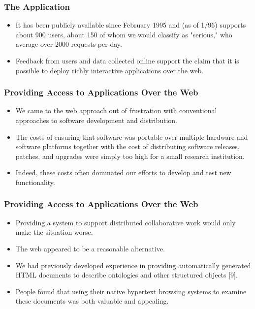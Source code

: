 \documentclass{beamer}
\begin{document}
\begin{frame}
\frametitle{The Application}

\begin{itemize}
\item It has been publicly available since February 1995 and (as of 1/96) supports about 900 users, about 150 of whom we would classify as "serious," who average over 2000 requests per day.
\item Feedback from users and data collected online support the claim that it is possible to deploy richly interactive applications over the web.
\end{itemize}

\end{frame}

\begin{frame}
\frametitle{Providing Access to Applications Over the Web}

\begin{itemize}
\item We came to the web approach out of frustration with conventional approaches to software development and distribution.
\item The costs of ensuring that software was portable over multiple hardware and software platforms together with the cost of distributing software releases, patches, and upgrades were simply too high for a small research institution.
\item Indeed, these costs often dominated our efforts to develop and test new functionality.
\end{itemize}

\end{frame}

\begin{frame}
\frametitle{Providing Access to Applications Over the Web}

\begin{itemize}
\item Providing a system to support distributed collaborative work would only make the situation worse.
\item The web appeared to be a reasonable alternative.
\item We had previously developed experience in providing automatically generated HTML documents to describe ontologies and other structured objects [9].
\item People found that using their native hypertext browsing systems to examine these documents was both valuable and appealing.
\end{itemize}

\end{frame}
\end{document}
